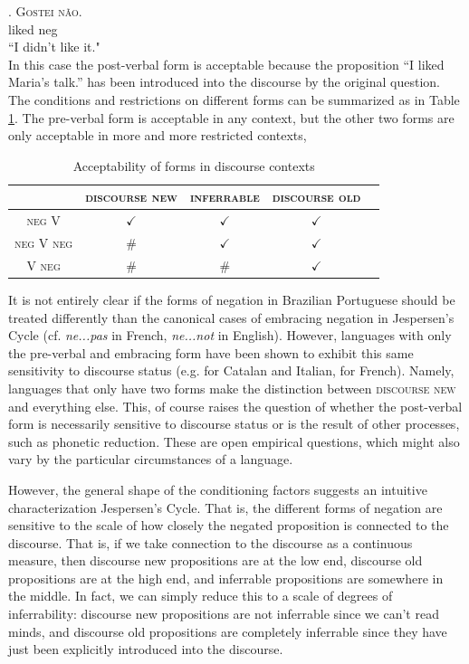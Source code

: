 \exg. \textsc{\color{green}Gostei} \textsc{\color{green}n{\~a}o}.\\
	  liked neg\\
	 ``I didn't like it."\\

In this case the post-verbal form is acceptable because the proposition ``I liked Maria's talk.'' has been introduced into the discourse by the original question. The conditions and restrictions on different forms can be summarized as in Table \ref{schwenter}. The pre-verbal form is acceptable in any context, but the other two forms are only acceptable in more and more restricted contexts,

\begin{table}
\begin{center}
\begin{tabular}{@{}ccccc@{}}
      \hline
       & \textsc{discourse new} & \textsc{inferrable} & \textsc{discourse old}\\ \hline
      \textsc{\color{red} neg V} & $\checkmark$ &  $\checkmark$ &  $\checkmark$ \\
      \textsc{\color{blue} neg V neg} & \#  & $\checkmark$ & $\checkmark$ \\
      \textsc{\color{green} V neg} & \#  & \#  & $\checkmark$ \\
      \hline
\end{tabular}     
\end{center}
\caption{Acceptability of forms in discourse contexts}     
\label{schwenter}
\end{table}


It is not entirely clear if the forms of negation in Brazilian Portuguese should be treated differently than the canonical cases of embracing negation in Jespersen's Cycle (cf. \emph{ne...pas} in French, \emph{ne...not} in English). However, languages with only the pre-verbal and embracing form have been shown to exhibit this same sensitivity to discourse status (e.g. \cite{schwenter2006} for Catalan and Italian, \cite{hansen2009} for French). Namely, languages that only have two forms make the distinction between \textsc{discourse new} and everything else. This, of course raises the question of whether the post-verbal form is necessarily sensitive to discourse status or is the result of other processes, such as phonetic reduction. These are open empirical questions, which might also vary by the particular circumstances of a language.

However, the general shape of the conditioning factors suggests an intuitive characterization Jespersen's Cycle. That is, the different forms of negation are sensitive to the scale of how closely the negated proposition is connected to the discourse. That is, if we take connection to the discourse as a continuous measure, then discourse new propositions are at the low end, discourse old propositions are at the high end, and inferrable propositions are somewhere in the middle. In fact, we can simply reduce this to a scale of degrees of inferrability: discourse new propositions are not inferrable since we can't read minds, and discourse old propositions are completely inferrable since they have just been explicitly introduced into the discourse. 

